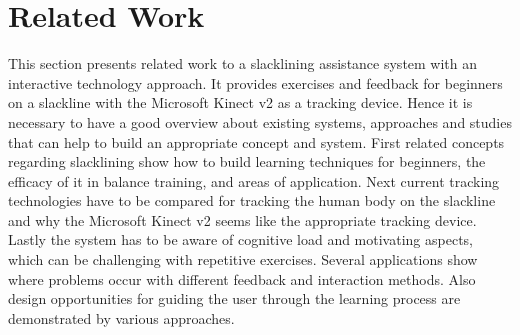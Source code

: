 \section{Related Work}
This section presents related work to a slacklining assistance system with an interactive technology approach. It provides exercises and feedback for beginners on a slackline with the Microsoft Kinect v2 as a tracking device. Hence it is necessary to have a good overview about existing systems, approaches and studies that can help to build an appropriate concept and system. First related concepts regarding slacklining show how to build learning techniques for beginners, the efficacy of it in balance training, and areas of application. Next current tracking technologies have to be compared for tracking the human body on the slackline and why the Microsoft Kinect v2 seems like the appropriate tracking device. Lastly the system has to be aware of cognitive load and motivating aspects, which can be challenging with repetitive exercises. Several applications show where problems occur with different feedback and interaction methods. Also design opportunities for guiding the user through the learning process are demonstrated by various approaches.